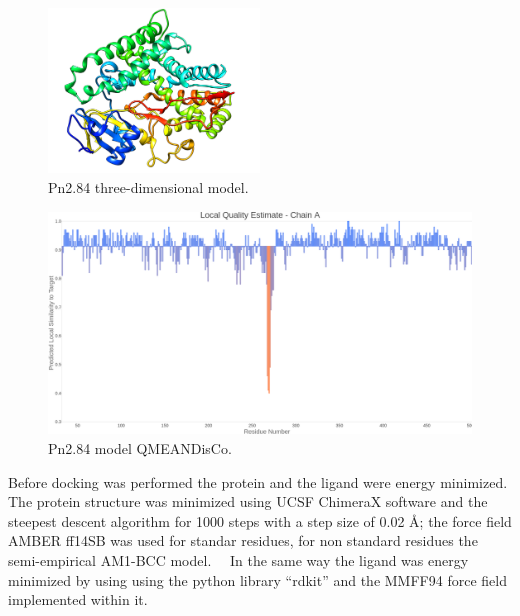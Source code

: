 \documentclass[12pt]{article}
\begin{document}
	\FloatBarrier
	\begin{figure}[H]
		\centering
		\includegraphics[width=0.5\textwidth]{../2/Minimize/model.png}
		\caption{Pn2.84 three-dimensional model.}
		\label{fig2_1}
	\end{figure}
	\FloatBarrier
	
	\FloatBarrier
	\begin{figure}[H]
		\centering
		\includegraphics[width=\textwidth-50pt]{../2/Swiss/Local_quality_estimate.png}
		\caption{Pn2.84 model QMEANDisCo.}
		\label{fig2_2}
	\end{figure}
	\FloatBarrier
	
	Before docking was performed the protein and the ligand were energy minimized. The protein structure was minimized using UCSF ChimeraX software \cite{chimera,chimera_2} and the steepest descent algorithm for 1000 steps with a step size of 0.02 \r{A}; the force field AMBER ff14SB was used for standar residues, for non standard residues the semi-empirical AM1-BCC model. \cite{am1_bcc,am1_bcc_2,am1_bcc_3}\ \ In the same way the ligand was energy minimized by using using the python library ``rdkit'' and the MMFF94 force field implemented within it. \cite{rdkit,rdkit_mmff}
	
\end{document}
